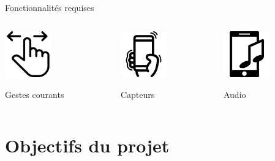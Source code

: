 \documentclass[xcolor=dvipsnames]{beamer}
\begin{document}
\begin{frame}{Fonctionnalités requises}
    \begin{columns}[T]
     \begin{column}[c]{3cm}
        \begin{center}\includegraphics[height=2cm]{Images/swipe.png}
        \end{center}
        \begin{center} Gestes courants
        \end{center}
     \end{column}
     \begin{column}[c]{3cm}
     \begin{center}\includegraphics[height=2cm]{Images/shake.png}
        \end{center}
        \begin{center} Capteurs
        \end{center}
     \end{column}
     \begin{column}[c]{3cm}
     \begin{center}\includegraphics[height=2cm]{Images/music-from-phone.png}
        \end{center}
        \begin{center} Audio
        \end{center}
     \end{column}
     \end{columns}
\end{frame}

\section{Objectifs du projet}
\end{document}
